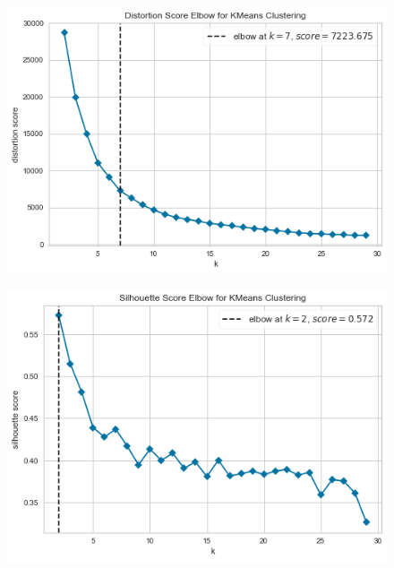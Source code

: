 \begin{figure}[h]
	\centering
	\begin{minipage}{.33\textwidth}
		\centering
		\includegraphics[width=\textwidth]{plots/timeseries/distortion_score.png}
		\label{fig:distortion_score}
	\end{minipage}%
	\begin{minipage}{.33\textwidth}
		\centering
		\includegraphics[width=\textwidth]{plots/timeseries/silhouette score.png}
		\label{fig:silhouette_score}
	\end{minipage}
	\begin{minipage}{.33\textwidth}
	    \centering

\end{minipage}
\end{figure}
